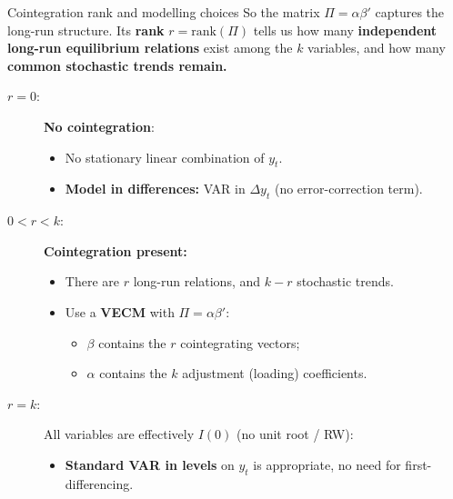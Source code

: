 \documentclass{beamer}
\begin{document}
\begin{frame}{Cointegration rank and modelling choices}
\small
So the matrix $\Pi=\alpha\beta'$ captures the long-run structure. Its \textbf{rank} $r = \mathrm{rank}(\Pi)$ tells us how many \textbf{independent long-run equilibrium relations} exist among the $k$ variables, and how many \textbf{common stochastic trends remain.}

\begin{description}
  \item[$r = 0$:] \textbf{No cointegration}: 
    \begin{itemize}
      \item No stationary linear combination of $y_t$.
      \item \textbf{Model in differences:} VAR in $\Delta y_t$ (no error-correction term).
    \end{itemize}
  \item[$0 < r < k$:] \textbf{Cointegration present:}
    \begin{itemize}
      \item There are $r$ long-run relations, and $k-r$ stochastic trends.
      \item Use a\textbf{ VECM} with $\Pi = \alpha\beta'$:
      \begin{itemize}
           \item $\beta$ contains the $r$ cointegrating vectors;
          \item $\alpha$ contains the $k$ adjustment (loading) coefficients.
        \end{itemize}
    \end{itemize}
  \item[$r = k$:] All variables are effectively $I(0)$ (no unit root / RW):
    \begin{itemize}
      \item \textbf{Standard VAR in levels} on $y_t$ is appropriate, no need for first-differencing. 
    \end{itemize}
\end{description}
\end{frame}
\end{document}
